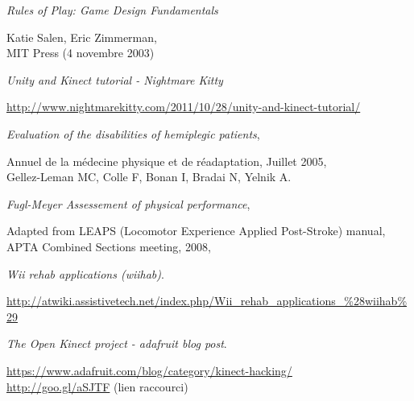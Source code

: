 \begin{thebibliography}{9}



  \emph{Rules of Play: Game Design Fundamentals}\\
  \begin{small}
  Katie Salen, Eric Zimmerman,\\
  MIT Press (4 novembre 2003)
  \end{small}

  
  \emph{Unity and Kinect tutorial - Nightmare Kitty}\\
  \begin{small}
  \url{http://www.nightmarekitty.com/2011/10/28/unity-and-kinect-tutorial/}
  \end{small}

  \emph{Evaluation of the disabilities of hemiplegic patients},\\
  \begin{small}
  Annuel de la médecine physique et de réadaptation, Juillet 2005,\\
  Gellez-Leman MC, Colle F, Bonan I, Bradai N, Yelnik A.\\
  \end{small}
  
  \emph{Fugl-Meyer Assessement of physical performance},\\
  \begin{small}
  Adapted from LEAPS (Locomotor Experience Applied Post-Stroke) manual,\\
  APTA Combined Sections meeting, 2008,\\
  \end{small}

  \emph{Wii rehab applications (wiihab)}.\\
  \begin{small}
  \url{http://atwiki.assistivetech.net/index.php/Wii_rehab_applications_\%28wiihab\%29}
  \end{small}
  
  \emph{The Open Kinect project - adafruit blog post}. \\
  \begin{small}
  \url{https://www.adafruit.com/blog/category/kinect-hacking/}\\
  \url{http://goo.gl/aSJTF} (lien raccourci)
  \end{small}


\end{thebibliography}
